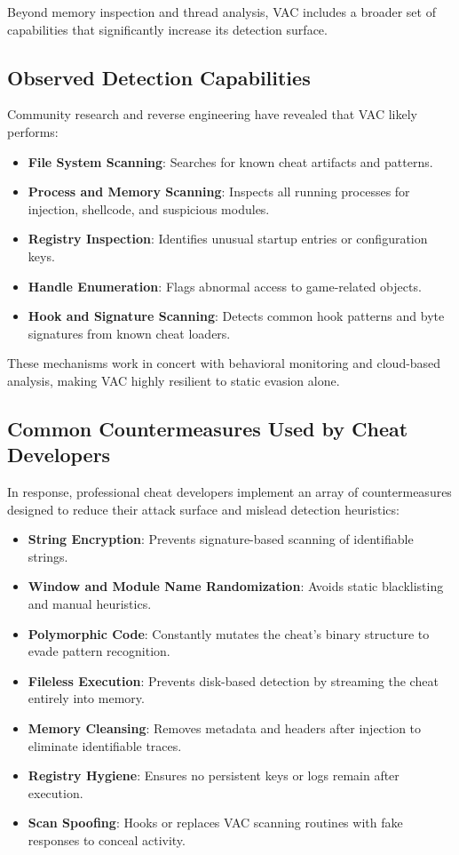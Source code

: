Beyond memory inspection and thread analysis, VAC includes a broader set of capabilities that significantly increase its detection surface.

\subsection*{Observed Detection Capabilities}

Community research and reverse engineering have revealed that VAC likely performs:

\begin{itemize}
    \item \textbf{File System Scanning}: Searches for known cheat artifacts and patterns.
    \item \textbf{Process and Memory Scanning}: Inspects all running processes for injection, shellcode, and suspicious modules.
    \item \textbf{Registry Inspection}: Identifies unusual startup entries or configuration keys.
    \item \textbf{Handle Enumeration}: Flags abnormal access to game-related objects.
    \item \textbf{Hook and Signature Scanning}: Detects common hook patterns and byte signatures from known cheat loaders.
\end{itemize}

These mechanisms work in concert with behavioral monitoring and cloud-based analysis, making VAC highly resilient to static evasion alone.

\subsection*{Common Countermeasures Used by Cheat Developers}

In response, professional cheat developers implement an array of countermeasures designed to reduce their attack surface and mislead detection heuristics:

\begin{itemize}
    \item \textbf{String Encryption}: Prevents signature-based scanning of identifiable strings.
    \item \textbf{Window and Module Name Randomization}: Avoids static blacklisting and manual heuristics.
    \item \textbf{Polymorphic Code}: Constantly mutates the cheat’s binary structure to evade pattern recognition.
    \item \textbf{Fileless Execution}: Prevents disk-based detection by streaming the cheat entirely into memory.
    \item \textbf{Memory Cleansing}: Removes metadata and headers after injection to eliminate identifiable traces.
    \item \textbf{Registry Hygiene}: Ensures no persistent keys or logs remain after execution.
    \item \textbf{Scan Spoofing}: Hooks or replaces VAC scanning routines with fake responses to conceal activity.
\end{itemize}

